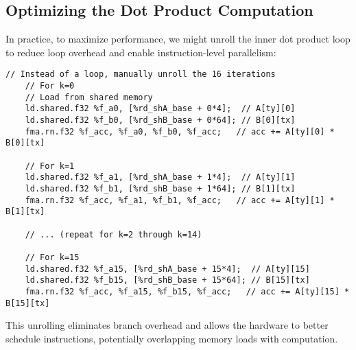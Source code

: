 \subsection{Optimizing the Dot Product Computation}

In practice, to maximize performance, we might unroll the inner dot product loop to reduce loop overhead and enable instruction-level parallelism:

\begin{lstlisting}[style=ptx]
    // Instead of a loop, manually unroll the 16 iterations
    // For k=0
    // Load from shared memory
    ld.shared.f32 %f_a0, [%rd_shA_base + 0*4];  // A[ty][0]
    ld.shared.f32 %f_b0, [%rd_shB_base + 0*64]; // B[0][tx]
    fma.rn.f32 %f_acc, %f_a0, %f_b0, %f_acc;   // acc += A[ty][0] * B[0][tx]
    
    // For k=1
    ld.shared.f32 %f_a1, [%rd_shA_base + 1*4];  // A[ty][1]
    ld.shared.f32 %f_b1, [%rd_shB_base + 1*64]; // B[1][tx]
    fma.rn.f32 %f_acc, %f_a1, %f_b1, %f_acc;   // acc += A[ty][1] * B[1][tx]
    
    // ... (repeat for k=2 through k=14)
    
    // For k=15
    ld.shared.f32 %f_a15, [%rd_shA_base + 15*4];  // A[ty][15]
    ld.shared.f32 %f_b15, [%rd_shB_base + 15*64]; // B[15][tx]
    fma.rn.f32 %f_acc, %f_a15, %f_b15, %f_acc;   // acc += A[ty][15] * B[15][tx]
\end{lstlisting}

This unrolling eliminates branch overhead and allows the hardware to better schedule instructions, potentially overlapping memory loads with computation.

